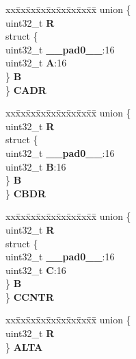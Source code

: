 \begin{DoxyCompactItemize}
\begin{tabbing}
\end{tabbing}\item 
\mbox{\label{structEMIOS__tag_1_1EMIOS__CH__tag_aa1267902c8b1daee195ea30817c07103}} 
\begin{tabbing}
xx\=xx\=xx\=xx\=xx\=xx\=xx\=xx\=xx\=\kill
union \{\\
\>uint32\_t {\bfseries R}\\
\>struct \{\\
\>\>uint32\_t {\bfseries \_\_pad0\_\_}:16\\
\>\>uint32\_t {\bfseries A}:16\\
\>\} {\bfseries B}\\
\} {\bfseries CADR}\\

\end{tabbing}\item 
\mbox{\label{structEMIOS__tag_1_1EMIOS__CH__tag_ad4c554e988ea0cbb73c46b3c8cd0101f}} 
\begin{tabbing}
xx\=xx\=xx\=xx\=xx\=xx\=xx\=xx\=xx\=\kill
union \{\\
\>uint32\_t {\bfseries R}\\
\>struct \{\\
\>\>uint32\_t {\bfseries \_\_pad0\_\_}:16\\
\>\>uint32\_t {\bfseries B}:16\\
\>\} {\bfseries B}\\
\} {\bfseries CBDR}\\

\end{tabbing}\item 
\mbox{\label{structEMIOS__tag_1_1EMIOS__CH__tag_ae8ed4e62b97e1948390ea836249fb2da}} 
\begin{tabbing}
xx\=xx\=xx\=xx\=xx\=xx\=xx\=xx\=xx\=\kill
union \{\\
\>uint32\_t {\bfseries R}\\
\>struct \{\\
\>\>uint32\_t {\bfseries \_\_pad0\_\_}:16\\
\>\>uint32\_t {\bfseries C}:16\\
\>\} {\bfseries B}\\
\} {\bfseries CCNTR}\\

\end{tabbing}\item 
\mbox{\label{structEMIOS__tag_1_1EMIOS__CH__tag_afc302fa7aa046123e89c9220faa9a12d}} 
\begin{tabbing}
xx\=xx\=xx\=xx\=xx\=xx\=xx\=xx\=xx\=\kill
union \{\\
\>uint32\_t {\bfseries R}\\
\} {\bfseries ALTA}\\


\end{tabbing}
\end{DoxyCompactItemize}
